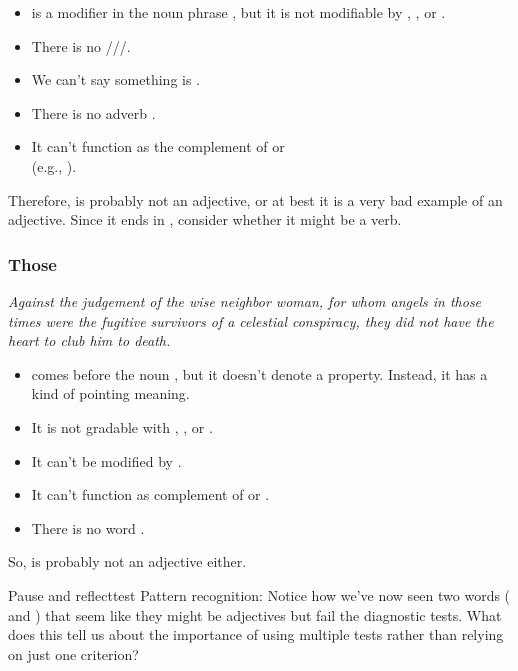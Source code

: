 \begin{itemize}[noitemsep]
    \item {} is a modifier in the noun phrase , but it is not modifiable by , , or .
    \item There is no ///.
    \item We can't say something is .
    \item There is no adverb .
    \item It can't function as the complement of  or  \\(e.g., ).
\end{itemize}
Therefore,  is probably not an adjective, or at best it is a very bad example of an adjective. Since it ends in , consider whether it might be a verb.

\subsubsection*{Those}
\textit{Against the judgement of the wise neighbor woman, for whom angels in \emph{those} times were the fugitive survivors of a celestial conspiracy, they did not have the heart to club him to death.}
\begin{itemize}[noitemsep]
    \item {} comes before the noun , but it doesn't denote a property. Instead, it has a kind of pointing meaning.
    \item It is not gradable with , , or .
    \item It can't be modified by .
    \item It can't function as complement of  or .
    \item There is no word .
\end{itemize}
So,  is probably not an adjective either.

\begin{tblsframedsymbol}{Pause and reflect}{test}
Pattern recognition: Notice how we've now seen two words ( and ) that seem like they might be adjectives but fail the diagnostic tests. What does this tell us about the importance of using multiple tests rather than relying on just one criterion?
\end{tblsframedsymbol}

